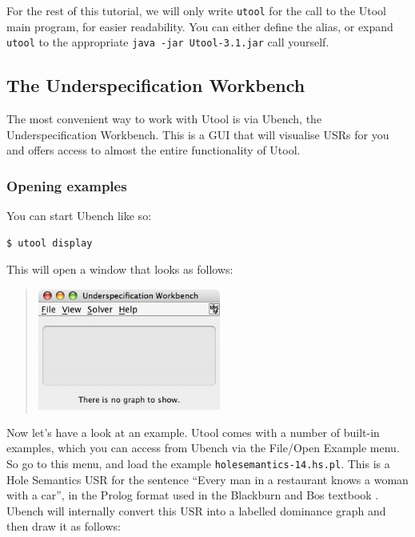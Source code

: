 For the rest of this tutorial, we will only write \verb?utool? for
the call to the Utool main program, for easier readability. You can
either define the alias, or expand \verb?utool? to the appropriate
\verb?java -jar Utool-3.1.jar? call yourself.




\subsection{The Underspecification Workbench}

The most convenient way to work with Utool is via Ubench, the Underspecification Workbench. This is a GUI that will visualise USRs for you and offers access to almost the entire functionality of Utool. 


\subsubsection{Opening examples}

You can start Ubench like so:

\begin{verbatim}
$ utool display
\end{verbatim}

This will open a window that looks as follows:

\begin{quotation}
\includegraphics[width=6cm]{ubench-empty.png}
\end{quotation}

Now let's have a look at an example. Utool comes with a number of built-in examples, which you can access from Ubench via the File/Open Example menu. So go to this menu, and load the example \verb?holesemantics-14.hs.pl?. This is a Hole Semantics USR for the sentence ``Every man in a restaurant knows a woman with a car'', in the Prolog format used in the Blackburn and Bos textbook \cite{blackburn05:_repres_infer_natur_languag}. Ubench will internally convert this USR into a labelled dominance graph and then draw it as follows:

